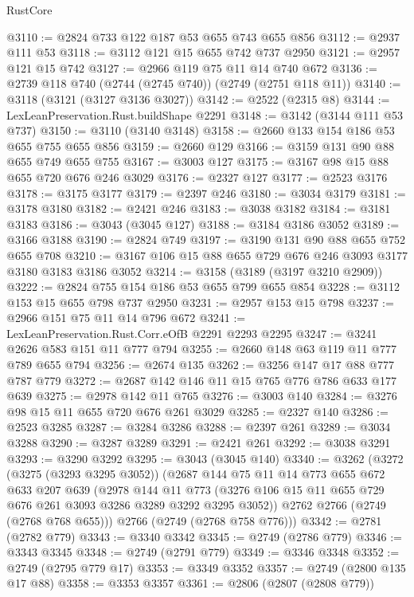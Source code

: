 \begin{lexlean}{RustCore}
\begin{coremodule}
@3110 := @2824 @733 @122 @187 @53 @655 @743 @655 @856
@3112 := @2937 @111 @53
@3118 := @3112 @121 @15 @655 @742 @737 @2950
@3121 := @2957 @121 @15 @742
@3127 := @2966 @119 @75 @11 @14 @740 @672
@3136 := @2739 @118 @740 (@2744 (@2745 @740)) (@2749 (@2751 @118 @11))
@3140 := @3118 (@3121 (@3127 @3136 @3027))
@3142 := @2522 (@2315 @8)
@3144 := LexLeanPreservation.Rust.buildShape @2291
@3148 := @3142 (@3144 @111 @53 @737)
@3150 := @3110 (@3140 @3148)
@3158 := @2660 @133 @154 @186 @53 @655 @755 @655 @856
@3159 := @2660 @129
@3166 := @3159 @131 @90 @88 @655 @749 @655 @755
@3167 := @3003 @127
@3175 := @3167 @98 @15 @88 @655 @720 @676 @246 @3029
@3176 := @2327 @127
@3177 := @2523 @3176
@3178 := @3175 @3177
@3179 := @2397 @246
@3180 := @3034 @3179
@3181 := @3178 @3180
@3182 := @2421 @246
@3183 := @3038 @3182
@3184 := @3181 @3183
@3186 := @3043 (@3045 @127)
@3188 := @3184 @3186 @3052
@3189 := @3166 @3188
@3190 := @2824 @749
@3197 := @3190 @131 @90 @88 @655 @752 @655 @708
@3210 := @3167 @106 @15 @88 @655 @729 @676 @246 @3093 @3177 @3180 @3183 @3186 @3052
@3214 := @3158 (@3189 (@3197 @3210 @2909))
@3222 := @2824 @755 @154 @186 @53 @655 @799 @655 @854
@3228 := @3112 @153 @15 @655 @798 @737 @2950
@3231 := @2957 @153 @15 @798
@3237 := @2966 @151 @75 @11 @14 @796 @672
@3241 := LexLeanPreservation.Rust.Corr.eOfB @2291 @2293 @2295
@3247 := @3241 @2626 @583 @151 @11 @777 @794
@3255 := @2660 @148 @63 @119 @11 @777 @789 @655 @794
@3256 := @2674 @135
@3262 := @3256 @147 @17 @88 @777 @787 @779
@3272 := @2687 @142 @146 @11 @15 @765 @776 @786 @633 @177 @639
@3275 := @2978 @142 @11 @765
@3276 := @3003 @140
@3284 := @3276 @98 @15 @11 @655 @720 @676 @261 @3029
@3285 := @2327 @140
@3286 := @2523 @3285
@3287 := @3284 @3286
@3288 := @2397 @261
@3289 := @3034 @3288
@3290 := @3287 @3289
@3291 := @2421 @261
@3292 := @3038 @3291
@3293 := @3290 @3292
@3295 := @3043 (@3045 @140)
@3340 := @3262
    (@3272
      (@3275 (@3293 @3295 @3052))
      (@2687
        @144
        @75
        @11
        @14
        @773
        @655
        @672
        @633
        @207
        @639
        (@2978
          @144
          @11
          @773
          (@3276 @106 @15 @11 @655 @729 @676 @261 @3093 @3286 @3289 @3292 @3295 @3052))
        @2762
        @2766
        (@2749 (@2768 @768 @655)))
      @2766
      (@2749 (@2768 @758 @776)))
@3342 := @2781 (@2782 @779)
@3343 := @3340 @3342
@3345 := @2749 (@2786 @779)
@3346 := @3343 @3345
@3348 := @2749 (@2791 @779)
@3349 := @3346 @3348
@3352 := @2749 (@2795 @779 @17)
@3353 := @3349 @3352
@3357 := @2749 (@2800 @135 @17 @88)
@3358 := @3353 @3357
@3361 := @2806 (@2807 (@2808 @779))

\end{coremodule}
\end{lexlean}
